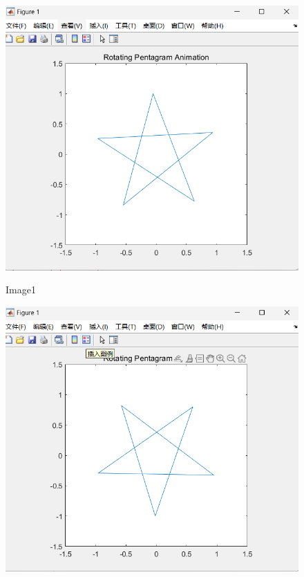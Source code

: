 \documentclass[12pt,UTF8]{ctexart}
\begin{document}
\begin{figure}[h]
 
\begin{minipage}{0.32\linewidth}
 
\vspace{3pt}
 
\centerline{\includegraphics[width=\textwidth]{9.1.png}}
 
 
\centerline{Image1}
 
\end{minipage}
 
\begin{minipage}{0.32\linewidth}
 
\vspace{3pt}
 
\centerline{\includegraphics[width=\textwidth]{9.2.png}}
 

\end{minipage}
\end{figure}
\end{document}
